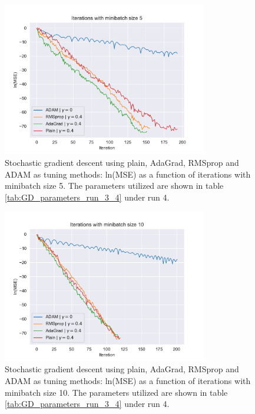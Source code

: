 \begin{figure}[H]
\centering
\includegraphics[width=0.8\textwidth]{Figures/PartA/minibatch_5_MSE(iter).pdf}
\caption{Stochastic gradient descent using plain, AdaGrad, RMSprop and ADAM as tuning methods: ln(MSE) as a function of iterations with minibatch size 5.
 The parameters utilized are shown in table \ref{tab:GD_parameters_run_3_4} under run 4.}
\label{fig:minibatch_5_MSE-iter}
\end{figure}

\begin{figure}[H]
\centering
\includegraphics[width=0.8\textwidth]{Figures/PartA/minibatch_10_MSE(iter).pdf}
\caption{Stochastic gradient descent using plain, AdaGrad, RMSprop and ADAM as tuning methods: ln(MSE) as a function of iterations with minibatch size 10.
 The parameters utilized are shown in table \ref{tab:GD_parameters_run_3_4} under run 4.}
\label{fig:minibatch_10_MSE-iter}
\end{figure}

